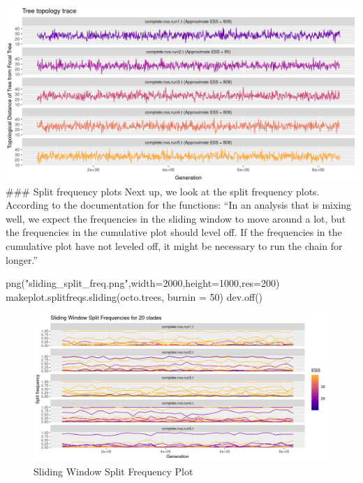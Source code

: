 \documentclass[
]{article}
\newenvironment{Shaded}{\begin{snugshade}}{\end{snugshade}}
\newcommand{\AttributeTok}[1]{\textcolor[rgb]{0.77,0.63,0.00}{#1}}
\newcommand{\DecValTok}[1]{\textcolor[rgb]{0.00,0.00,0.81}{#1}}
\newcommand{\FunctionTok}[1]{\textcolor[rgb]{0.00,0.00,0.00}{#1}}
\newcommand{\NormalTok}[1]{#1}
\newcommand{\StringTok}[1]{\textcolor[rgb]{0.31,0.60,0.02}{#1}}
\begin{document}
\includegraphics{Topology_trace.png} \#\#\# Split frequency plots Next
up, we look at the split frequency plots. According to the documentation
for the functions: ``In an analysis that is mixing well, we expect the
frequencies in the sliding window to move around a lot, but the
frequencies in the cumulative plot should level off. If the frequencies
in the cumulative plot have not leveled off, it might be necessary to
run the chain for longer.''

\begin{Shaded}
\begin{Highlighting}[]
\FunctionTok{png}\NormalTok{(}\StringTok{"sliding\_split\_freq.png"}\NormalTok{,}\AttributeTok{width=}\DecValTok{2000}\NormalTok{,}\AttributeTok{height=}\DecValTok{1000}\NormalTok{,}\AttributeTok{res=}\DecValTok{200}\NormalTok{)}
\FunctionTok{makeplot.splitfreqs.sliding}\NormalTok{(octo.trees, }\AttributeTok{burnin =} \DecValTok{50}\NormalTok{)}
\FunctionTok{dev.off}\NormalTok{()}
\end{Highlighting}
\end{Shaded}

\begin{figure}
\centering
\includegraphics{sliding_split_freq.png}
\caption{Sliding Window Split Frequency Plot}
\end{figure}
\end{document}
